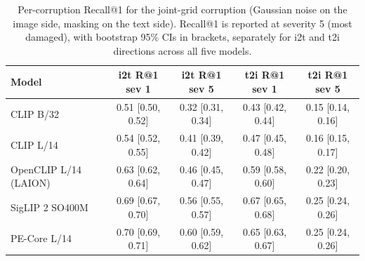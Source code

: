 \begin{table}[h]
\centering
\caption{Per-corruption Recall@1 for the joint-grid corruption (Gaussian noise on the image side, masking on the text side). Recall@1 is reported at severity 5 (most damaged), with bootstrap 95\% CIs in brackets, separately for i2t and t2i directions across all five models.}
\label{tab:t3_per_corruption}
\footnotesize
\begin{tabular}{lcccc}
\toprule
Model & i2t R@1 sev 1 & i2t R@1 sev 5 & t2i R@1 sev 1 & t2i R@1 sev 5 \\
\midrule
CLIP B/32 & 0.51 [0.50, 0.52] & 0.32 [0.31, 0.34] & 0.43 [0.42, 0.44] & 0.15 [0.14, 0.16] \\
CLIP L/14 & 0.54 [0.52, 0.55] & 0.41 [0.39, 0.42] & 0.47 [0.45, 0.48] & 0.16 [0.15, 0.17] \\
OpenCLIP L/14 (LAION) & 0.63 [0.62, 0.64] & 0.46 [0.45, 0.47] & 0.59 [0.58, 0.60] & 0.22 [0.20, 0.23] \\
SigLIP 2 SO400M & 0.69 [0.67, 0.70] & 0.56 [0.55, 0.57] & 0.67 [0.65, 0.68] & 0.25 [0.24, 0.26] \\
PE-Core L/14 & 0.70 [0.69, 0.71] & 0.60 [0.59, 0.62] & 0.65 [0.63, 0.67] & 0.25 [0.24, 0.26] \\
\bottomrule
\end{tabular}
\end{table}